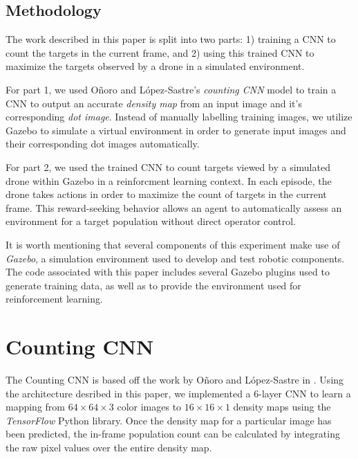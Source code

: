 \documentclass[10pt,twocolumn,letterpaper]{article}
\begin{document}
\subsection{Methodology}

  The work described in this paper is split into two parts: 1) training a CNN
  to count the targets in the current frame, and 2) using this trained CNN to
  maximize the targets observed by a drone in a simulated environment. 
  
  For part 1, we used O\~noro and L\'opez-Sastre's \textit{counting CNN} model
  \cite{onoro2016} to train a CNN to output an accurate \textit{density map}
  from an input image and it's corresponding \textit{dot image}. Instead of
  manually labelling training images, we utilize Gazebo to simulate a virtual
  environment in order to generate input images and their corresponding dot
  images automatically.

  For part 2, we used the trained CNN to count targets viewed by a simulated
  drone within Gazebo in a reinforcment learning context. In each episode, the
  drone takes actions in order to maximize the count of targets in the current
  frame. This reward-seeking behavior allows an agent to automatically assess
  an environment for a target population without direct operator control.

  It is worth mentioning that several components of this experiment make use of
  \textit{Gazebo}, a simulation environment used to develop and test robotic
  components. The code associated with this paper includes several Gazebo
  plugins used to generate training data, as well as to provide the environment
  used for reinforcement learning.


\section{Counting CNN}

  The Counting CNN is based off the work by O\~noro and L\'opez-Sastre in
  \cite{onoro2016}. Using the architecture desribed in this paper, we
  implemented a 6-layer CNN to learn a mapping from $64 \times 64 \times 3$
  color images to $16 \times 16 \times 1$ density maps using the
  \textit{TensorFlow} Python library. Once the density map for a particular
  image has been predicted, the in-frame population count can be calculated by
  integrating the raw pixel values over the entire density map.
\end{document}
